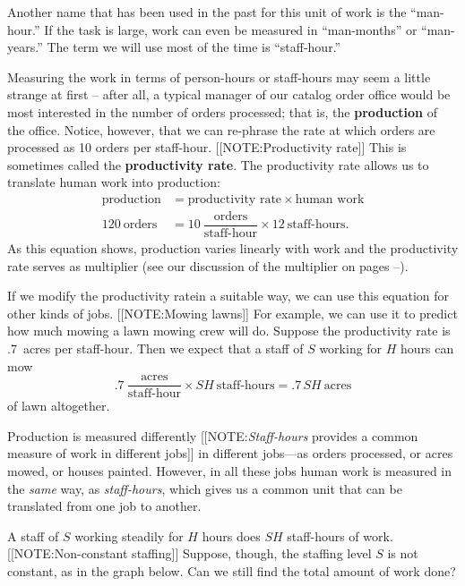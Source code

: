 Another name that has been used in the past for this unit of work is
the ``man-hour.''  If the task is large, work can even be measured in
``man-months'' or ``man-years.''  The term we will use most of the
time is ``staff-hour.''

Measuring the work in terms of person-hours or staff-hours may seem a
little strange at first -- after all, a typical manager of our catalog
order office would be most interested in the number of orders
processed; that is, the {\bf production\/} of the office.  Notice,
however, that we can re-phrase the rate at which orders are processed
as 10 orders per staff-hour.
[[NOTE:Productivity rate]]
This is sometimes called the {\bf productivity rate}.  The productivity rate allows us to translate human work into production:
\begin{align*}
\mbox{production} &= \mbox{productivity rate} \times
		\mbox{human work} \\
120 \ \mbox{orders} &=
		10 \ \dfrac{\mbox{orders}}{\mbox{staff-hour}}
		\times 12 \ \mbox{staff-hours}.
\end{align*}
As this equation shows, production varies linearly with work and the
productivity rate serves as multiplier (see our discussion of the
multiplier on pages
\pageref{multiplier-begin}--\pageref{multiplier-end}).

	If we modify the productivity ratein a suitable way, we can use this equation for other kinds of jobs.  
	[[NOTE:Mowing lawns]]
For example, we can use it to predict how much mowing a lawn mowing crew will do.  Suppose the productivity rate is .7~acres per staff-hour.  Then we expect that a staff of $S$ working for $H$ hours can mow
\[
.7 \ \dfrac{\mbox{acres}}{\mbox{staff-hour}} \times
	SH \ \mbox{staff-hours} = .7\,SH \ \mbox{acres}
\]
of lawn altogether.  



Production is measured differently 
[[NOTE:{\em Staff-hours\/} provides a common measure of work in different jobs]]
in different jobs---as orders processed, or acres mowed, or houses
painted.  However, in all these jobs human work is measured in the
{\em same\/} way, as {\em staff-hours}, which gives us a common unit
that can be translated from one job to another.

	A staff of $S$ working steadily for $H$ hours does $SH$ staff-hours of work.  
	[[NOTE:Non-constant staffing]]
Suppose, though,  the staffing level $S$ is not constant, as in the graph below.  Can we still find the total amount of work done?
\label{graph2}

